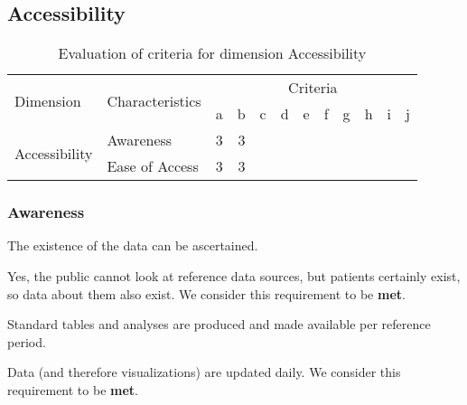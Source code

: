 \newpage
\subsection{Accessibility}

\begin{table}[htbp]
    \centering

    \begin{tabular}{llrrrrrrrrrr}
        \toprule
        \multirow{2}{*}{Dimension}      & \multirow{2}{*}{Characteristics}  & \multicolumn{10}{c}{Criteria}         \\ \cmidrule(lr){3-12}
                                        &                                   & a & b & c & d & e & f & g & h & i & j \\ \midrule
        \multirow{2}{*}{Accessibility}  & Awareness                         & 3 & 3 &   &   &   &   &   &   &   &   \\
                                        & Ease of Access                    & 3 & 3 &   &   &   &   &   &   &   &   \\
        \bottomrule
    \end{tabular}

    \caption{Evaluation of criteria for dimension Accessibility}
    \label{table:accessibility-benchmark}
\end{table}
\FloatBarrier

\subsubsection{Awareness}

\begin{QandA}
    \item The existence of the data can be ascertained.
    \begin{answered}
        Yes, the public cannot look at reference data sources, but patients certainly exist, so data about them also exist.
        We consider this requirement to be \textbf{met}.
    \end{answered}

    \item Standard tables and analyses are produced and made available per reference period.
    \begin{answered}
        Data (and therefore visualizations) are updated daily.
        We consider this requirement to be \textbf{met}.
    \end{answered}

\end{QandA}

